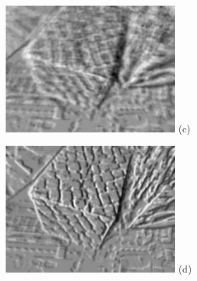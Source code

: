 \begin{figure}[H]
    \hfill
    \begin{minipage}[t]{0.48\textwidth}
      \centering \includegraphics[width =
      \textwidth]{images/zero_motion_1321.jpg} (c)
    \end{minipage}
    \hfill
    \begin{minipage}[t]{0.48\textwidth}
      \centering \includegraphics[width =
      \textwidth]{images/optimized_1321.jpg} (d)
    \end{minipage}
    \hfill
    \begin{minipage}[t]{0.48\textwidth}

\end{minipage}
\end{figure}
